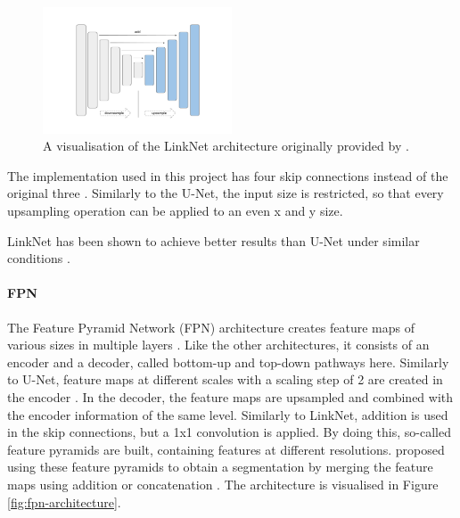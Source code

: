 \begin{figure}[htb!]
	\centering
	\includegraphics[width=0.5\textwidth]{fig/LinkNet-architecture.png}
	\caption{A visualisation of the LinkNet architecture originally provided by \citeauthor{SegmentationModels} \cite{SegmentationModels}.}
	\label{fig:LinkNet-architecture}
\end{figure}



The implementation used in this project has four skip connections instead of the original three \cite{SegmentationModels}. Similarly to the U-Net, the input size is restricted, so that every upsampling operation can be applied to an even x and y size.

LinkNet has been shown to achieve better results than U-Net under similar conditions \cite{Gao2022}.

\paragraph{FPN}

The Feature Pyramid Network (FPN) architecture creates feature maps of various sizes in multiple layers \cite{Norelyaqine2023}. Like the other architectures, it consists of an encoder and a decoder, called bottom-up and top-down pathways here\cite{fpn}. Similarly to U-Net, feature maps at different scales with a scaling step of 2 are created in the encoder \cite{fpn}. In the decoder, the feature maps are upsampled and combined with the encoder information of the same level. Similarly to LinkNet, addition is used in the skip connections, but a 1x1 convolution is applied. By doing this, so-called feature pyramids are built, containing features at different resolutions. \citeauthor{kirillov2019panoptic} proposed using these feature pyramids to obtain a segmentation by merging the feature maps using addition or concatenation \cite{kirillov2019panoptic, SegmentationModels}. The architecture is visualised in Figure \ref{fig:fpn-architecture}.

